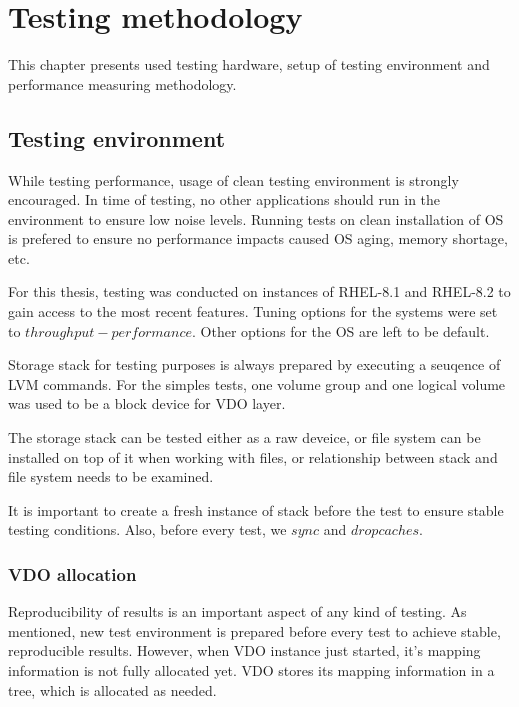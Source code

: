 \documentclass[
  color, %
  table, %
  lof,   %
  lot,   %
]{fithesis3}
\begin{document}


\chapter{Testing methodology}
\label{methodology}
This chapter presents used testing hardware, setup of testing environment and performance measuring methodology.


\section{Testing environment}
While testing performance, usage of clean testing environment is strongly encouraged. In time of testing, no other applications should run in the environment to ensure low noise levels. Running tests on clean installation of OS is prefered to ensure no performance impacts caused OS aging, memory shortage, etc.

For this thesis, testing was conducted on instances of RHEL-8.1 and RHEL-8.2 to gain access to the most recent features. Tuning options for the systems were set to $throughput-performance$. Other options for the OS are left to be default.

Storage stack for testing purposes is always prepared by executing a seuqence of LVM commands. For the simples tests, one volume group and one logical volume was used to be a block device for VDO layer.

The storage stack can be tested either as a raw deveice, or file system can be installed on top of it when working with files, or relationship between stack and file system needs to be examined.

It is important to create a fresh instance of stack before the test to ensure stable testing conditions. Also, before every test, we $sync$ and $drop caches$. 

\subsection{VDO allocation}
\label{alloc}
Reproducibility of results is an important aspect of any kind of testing. As mentioned, new test environment is prepared before every test to achieve stable, reproducible results. However, when VDO instance just started, it's mapping information is not fully allocated yet. VDO stores its mapping information in a tree, which is allocated as needed.
\end{document}
